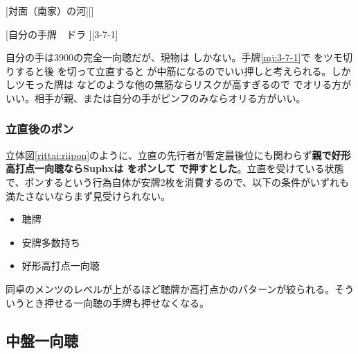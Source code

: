 \documentclass[10pt, twocolumn]{article}
\begin{document}
[対面（南家）の河][]

[自分の手牌　ドラ ][3-7-1]

自分の手は3900の完全一向聴だが、現物は  しかない。手牌\ref{mj:3-7-1}で  をツモ切りすると後  を切って立直すると  が中筋になるのでいい押しと考えられる。しかしツモった牌は  などのような他の無筋ならリスクが高すぎるので  でオリる方がいい。相手が親、または自分の手がピンフのみならオリる方がいい\citep[][pp.122--127]{tetsuoshi}。

\subsubsection*{立直後のポン}

\begin{rittai}[h]
  \centering
  
  
  \caption{立直を受けている状態でポンするか}
  \label{rittai:riipon}
\end{rittai}

立体図\ref{rittai:riipon}のように、立直の先行者が暫定最後位にも関わらず\textbf{親で好形高打点一向聴ならSuphxは  をポンして  で押すとした}\citep[][pp.~46--47]{suphx}。立直を受けている状態で、ポンするという行為自体が安牌2枚を消費するので、以下の条件がいずれも満たさないならまず見受けられない。

\begin{itemize}
\item 聴牌
\item 安牌多数持ち
\item 好形高打点一向聴
\end{itemize}

同卓のメンツのレベルが上がるほど聴牌か高打点かのパターンが絞られる。そういうとき押せる一向聴の手牌も押せなくなる。


\subsection{中盤一向聴}
\end{document}
